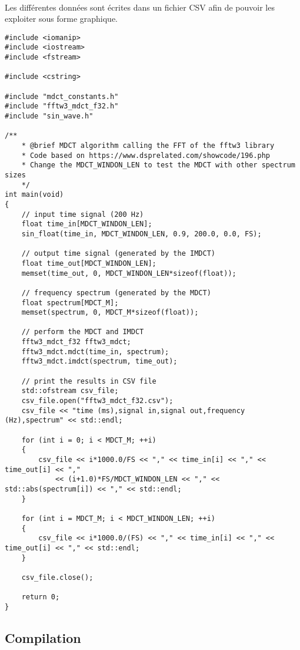 \documentclass{article}
\begin{document}
\paragraph{}
Les différentes données sont écrites dans un fichier CSV afin de pouvoir les exploiter sous forme graphique.
\lstset{language=C++}
\begin{lstlisting}
#include <iomanip>
#include <iostream>
#include <fstream>

#include <cstring>

#include "mdct_constants.h"
#include "fftw3_mdct_f32.h"
#include "sin_wave.h"

/**
    * @brief MDCT algorithm calling the FFT of the fftw3 library
    * Code based on https://www.dsprelated.com/showcode/196.php
    * Change the MDCT_WINDON_LEN to test the MDCT with other spectrum sizes
    */
int main(void)
{
    // input time signal (200 Hz)
    float time_in[MDCT_WINDON_LEN];
    sin_float(time_in, MDCT_WINDON_LEN, 0.9, 200.0, 0.0, FS);

    // output time signal (generated by the IMDCT)
    float time_out[MDCT_WINDON_LEN];
    memset(time_out, 0, MDCT_WINDON_LEN*sizeof(float));

    // frequency spectrum (generated by the MDCT)
    float spectrum[MDCT_M];
    memset(spectrum, 0, MDCT_M*sizeof(float));

    // perform the MDCT and IMDCT
    fftw3_mdct_f32 fftw3_mdct;
    fftw3_mdct.mdct(time_in, spectrum);
    fftw3_mdct.imdct(spectrum, time_out);

    // print the results in CSV file
    std::ofstream csv_file;
    csv_file.open("fftw3_mdct_f32.csv");
    csv_file << "time (ms),signal in,signal out,frequency (Hz),spectrum" << std::endl;

    for (int i = 0; i < MDCT_M; ++i)
    {
        csv_file << i*1000.0/FS << "," << time_in[i] << "," << time_out[i] << ","
            << (i+1.0)*FS/MDCT_WINDON_LEN << "," << std::abs(spectrum[i]) << "," << std::endl;
    }

    for (int i = MDCT_M; i < MDCT_WINDON_LEN; ++i)
    {
        csv_file << i*1000.0/(FS) << "," << time_in[i] << "," << time_out[i] << "," << std::endl;
    }

    csv_file.close();

    return 0;
}
\end{lstlisting}

\subsection{Compilation}\label{app:fftw3_example_compilation}
\end{document}
